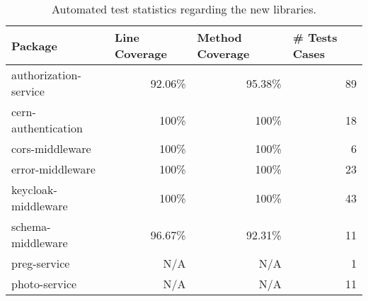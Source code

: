 \begin{table}[htbp]
\begin{tabular}{|l|r|r|r|}
\hline
Package & \multicolumn{1}{l|}{Line Coverage} & \multicolumn{1}{l|}{Method Coverage} & \multicolumn{1}{l|}{\# Tests Cases} \\ \hline
authorization-service & 92.06\% & 95.38\% & 89 \\
cern-authentication   & 100\%   & 100\%   & 18 \\
cors-middleware       & 100\%   & 100\%   & 6  \\
error-middleware      & 100\%   & 100\%   & 23 \\
keycloak-middleware   & 100\%   & 100\%   & 43 \\
schema-middleware     & 96.67\% & 92.31\% & 11 \\
preg-service          & N/A     & N/A     & 1  \\
photo-service         & N/A     & N/A     & 11 \\
\hline
\end{tabular}
\caption{Automated test statistics regarding the new libraries.}
\label{table:common-libs-test}
\end{table}

